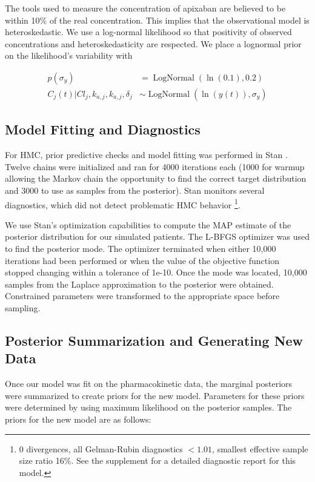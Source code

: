 The tools used to measure the concentration of apixaban are believed to be within 10\% of the real concentration.  This implies that the observational model is heteroskedastic. We use a log-normal likelihood so that positivity of observed concentrations and heteroskedasticity are respected. We place a lognormal prior on the likelihood’s variability with

\begin{align}
	p(\sigma_y)  &= \operatorname{LogNormal}(\ln(0.1), 0.2) \label{eq:eq_16}\\
	C_{j}(t) \vert Cl_{j}, k_{a,j}, k_{a,j}, \delta_j &\sim \operatorname{LogNormal}(\ln(y(t)), \sigma_y)  \label{eq:eq_17}
\end{align}


\subsection*{Model Fitting and Diagnostics}

For HMC, prior predictive checks and model fitting was performed in Stan \cite{Carpenter2017-qf}.  Twelve chains were initialized and ran for 4000 iterations each (1000 for warmup allowing the Markov chain the opportunity to find the correct target distribution and 3000 to use as samples from the posterior). Stan monitors several diagnostics, which did not detect problematic HMC behavior \footnote{0 divergences, all Gelman-Rubin diagnostics $<1.01$, smallest effective sample size ratio 16\%.  See the supplement for a detailed diagnostic report for this model.}.

We use Stan’s optimization capabilities to compute the MAP estimate of the posterior distribution for our simulated patients.  The L-BFGS optimizer was used to find the posterior mode.  The optimizer terminated when either 10,000 iterations had been performed or when the value of the objective function stopped changing within a tolerance of 1e-10. Once the mode was located, 10,000 samples from the Laplace approximation to the posterior were obtained. Constrained parameters were transformed to the appropriate space before sampling.

\subsection*{Posterior Summarization and Generating New Data}

Once our model was fit on the pharmacokinetic data, the marginal posteriors were summarized to create priors for the new model.  Parameters for these priors were determined by using maximum likelihood on the posterior samples.  The priors for the new model are as follows:

